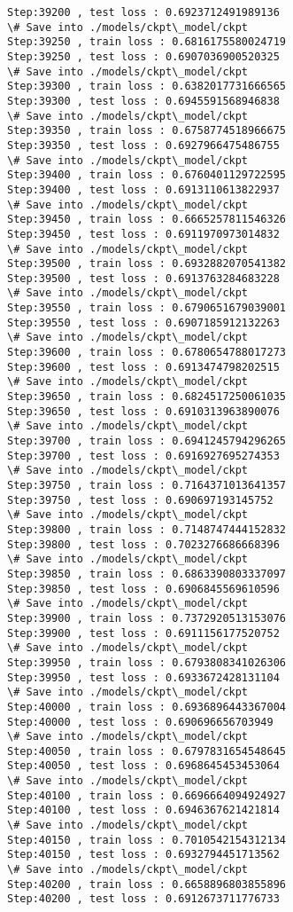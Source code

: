 \documentclass[11pt]{article}
\begin{document}
\begin{Verbatim}[commandchars=\\\{\}]
Step:39200 , test loss : 0.6923712491989136
\# Save into ./models/ckpt\_model/ckpt
Step:39250 , train loss : 0.6816175580024719
Step:39250 , test loss : 0.6907036900520325
\# Save into ./models/ckpt\_model/ckpt
Step:39300 , train loss : 0.6382017731666565
Step:39300 , test loss : 0.6945591568946838
\# Save into ./models/ckpt\_model/ckpt
Step:39350 , train loss : 0.6758774518966675
Step:39350 , test loss : 0.6927966475486755
\# Save into ./models/ckpt\_model/ckpt
Step:39400 , train loss : 0.6760401129722595
Step:39400 , test loss : 0.6913110613822937
\# Save into ./models/ckpt\_model/ckpt
Step:39450 , train loss : 0.6665257811546326
Step:39450 , test loss : 0.6911970973014832
\# Save into ./models/ckpt\_model/ckpt
Step:39500 , train loss : 0.6932882070541382
Step:39500 , test loss : 0.6913763284683228
\# Save into ./models/ckpt\_model/ckpt
Step:39550 , train loss : 0.6790651679039001
Step:39550 , test loss : 0.6907185912132263
\# Save into ./models/ckpt\_model/ckpt
Step:39600 , train loss : 0.6780654788017273
Step:39600 , test loss : 0.6913474798202515
\# Save into ./models/ckpt\_model/ckpt
Step:39650 , train loss : 0.6824517250061035
Step:39650 , test loss : 0.6910313963890076
\# Save into ./models/ckpt\_model/ckpt
Step:39700 , train loss : 0.6941245794296265
Step:39700 , test loss : 0.6916927695274353
\# Save into ./models/ckpt\_model/ckpt
Step:39750 , train loss : 0.7164371013641357
Step:39750 , test loss : 0.690697193145752
\# Save into ./models/ckpt\_model/ckpt
Step:39800 , train loss : 0.7148747444152832
Step:39800 , test loss : 0.7023276686668396
\# Save into ./models/ckpt\_model/ckpt
Step:39850 , train loss : 0.6863390803337097
Step:39850 , test loss : 0.6906845569610596
\# Save into ./models/ckpt\_model/ckpt
Step:39900 , train loss : 0.7372920513153076
Step:39900 , test loss : 0.6911156177520752
\# Save into ./models/ckpt\_model/ckpt
Step:39950 , train loss : 0.6793808341026306
Step:39950 , test loss : 0.6933672428131104
\# Save into ./models/ckpt\_model/ckpt
Step:40000 , train loss : 0.6936896443367004
Step:40000 , test loss : 0.690696656703949
\# Save into ./models/ckpt\_model/ckpt
Step:40050 , train loss : 0.6797831654548645
Step:40050 , test loss : 0.6968645453453064
\# Save into ./models/ckpt\_model/ckpt
Step:40100 , train loss : 0.6696664094924927
Step:40100 , test loss : 0.6946367621421814
\# Save into ./models/ckpt\_model/ckpt
Step:40150 , train loss : 0.7010542154312134
Step:40150 , test loss : 0.6932794451713562
\# Save into ./models/ckpt\_model/ckpt
Step:40200 , train loss : 0.6658896803855896
Step:40200 , test loss : 0.6912673711776733

\end{Verbatim}
\end{document}

